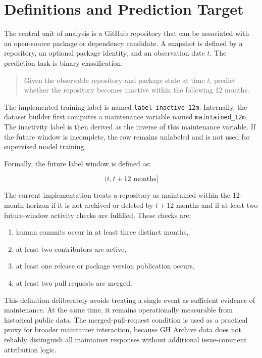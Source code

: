 \section{Definitions and Prediction Target}
\label{sec:method-definitions}

The central unit of analysis is a GitHub repository that can be associated with an open-source package or dependency candidate. A snapshot is defined by a repository, an optional package identity, and an observation date \(t\). The prediction task is binary classification:

\begin{quote}
Given the observable repository and package state at time \(t\), predict whether the repository becomes inactive within the following 12 months.
\end{quote}

The implemented training label is named \texttt{label\_inactive\_12m}. Internally, the dataset builder first computes a maintenance variable named \texttt{maintained\_12m}. The inactivity label is then derived as the inverse of this maintenance variable. If the future window is incomplete, the row remains unlabeled and is not used for supervised model training.

Formally, the future label window is defined as:

\[
(t, t + 12\text{ months}]
\]

The current implementation treats a repository as maintained within the 12-month horizon if it is not archived or deleted by \(t + 12\text{ months}\) and if at least two future-window activity checks are fulfilled. These checks are:

\begin{enumerate}
    \item human commits occur in at least three distinct months,
    \item at least two contributors are active,
    \item at least one release or package version publication occurs,
    \item at least two pull requests are merged.
\end{enumerate}

This definition deliberately avoids treating a single event as sufficient evidence of maintenance. At the same time, it remains operationally measurable from historical public data. The merged-pull-request condition is used as a practical proxy for broader maintainer interaction, because GH Archive data does not reliably distinguish all maintainer responses without additional issue-comment attribution logic.

